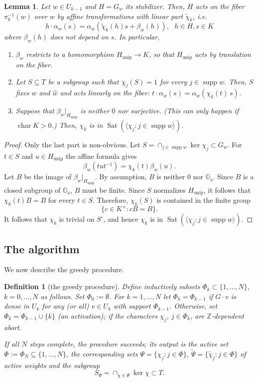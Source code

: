 \documentclass[12pt]{article}
\newtheorem{lemma}[theorem]{Lemma}
\newtheorem{definition}[theorem]{Definition}
\newcommand{\Z}{\mathbb{Z}}
\newcommand{\supp}{\operatorname{supp}}
\newcommand{\rest}{\big |}
\newcommand{\rad}[1]{#1_{\operatorname{unip}}}
\newcommand{\Sat}{\operatorname{Sat}}
\newcommand{\chr}{\operatorname{char}}
\newcommand{\Addgrp}{\mathbb{G}_{\operatorname{a}}}
\begin{document}
\begin{lemma}\label{lem:fiber}
Let $w\in U_{k-1}$ and $H=G_w$ its stabilizer.
Then, $H$ acts on the fiber $\pi_k^{-1}(w)$ over $w$ by affine transformations with linear part $\tilde\chi_k$, i.e.
\[
h\cdot\alpha_w(s)=\alpha_w(\tilde\chi_k(h)s+\beta_w(h)),\ \ \ h\in H, s\in K
\]
where $\beta_w(h)$ does not depend on $s$. In particular,
\begin{enumerate}
\item \label{part: action} $\beta_w$ restricts to a homomorphism $\rad{H}\rightarrow K$, so that $\rad{H}$ acts by translation on the fiber.
\item \label{part: torusaction} Let $S\subseteq T$ be a subgroup such that $\chi_j(S)=1$ for every $j\in\supp w$. Then, $S$ fixes
$w$ and $\hat w$ and acts linearly on the fiber: $t\cdot\alpha_w(s)=\alpha_w(\chi_k(t)\,s)$.
\item \label{part: Bfinite} Suppose that $\beta_w\rest_{\rad{H}}$ is neither $0$ nor surjective.
(This can only happen if $\chr K>0$.) Then, $\chi_k$ is in $\Sat(\langle\chi_j:j\in\supp w\rangle)$.
\end{enumerate}
\end{lemma}

\begin{proof}
Only the last part is non-obvious. Let $S=\cap_{j\in\supp w}\ker\chi_j\subset G_w$.
For $t\in S$ and $u\in \rad{H}$ the affine formula gives
\[
\beta_w(tut^{-1})=\chi_k(t)\beta_w(u).
\]
Let $B$ be the image of $\beta_w\rest_{\rad{H}}$. By assumption, $B$ is neither $0$ nor $\Addgrp$.
Since $B$ is a closed subgroup of $\Addgrp$, $B$ must be finite.
Since $S$ normalizes $\rad{H}$, it follows that $\chi_k(t)B=B$ for every $t\in S$.
Therefore, $\chi_k(S)$ is contained in the finite group
\[
\{c\in K^\times:cB=B\}.
\]
It follows that $\chi_k$ is trivial on $S^\circ$, and hence $\chi_k$ is in $\Sat(\langle\chi_j:j\in\supp w\rangle)$.
\end{proof}


\subsection{The algorithm}
We now describe the greedy procedure.

\begin{definition}[the greedy procedure] \label{def:greedy}
Define inductively subsets $\Phi_k\subset\{1,\dots,N\}$, $k=0,\dots,N$ as follows.
Set $\Phi_0:=\emptyset$.
For $k=1,\dots,N$ let $\Phi_k=\Phi_{k-1}$ if $G\cdot v$ is dense in $U_k$
for any (or all) $v\in U_k$ with support $\Phi_{k-1}$.
Otherwise, set $\Phi_k=\Phi_{k-1}\cup\{k\}$ (an \emph{activation});
if the characters $\chi_j$, $j\in\Phi_k$, are $\Z$-dependent \emph{abort}.

If all $N$ steps complete, the procedure \emph{succeeds}; its output is the \emph{active set}
$\Phi:=\Phi_N\subseteq\{1,\dots,N\}$, the corresponding sets $\Psi=\{\chi_j:j\in\Phi\}$,  $\tilde\Psi=\{\tilde\chi_j:j\in\Phi\}$ of \emph{active weights}
and the subgroup
\begin{equation} \label{def: Spsi}
S_\Psi=\cap_{\chi\in\Psi}\ker\chi\subset T.
\end{equation}
\end{definition}
\end{document}

